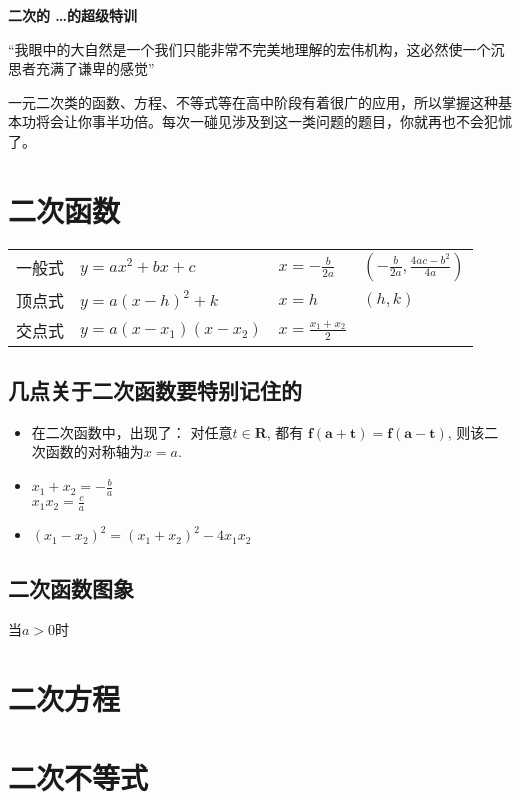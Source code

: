 \documentclass{article}
\newcommand*{\num}{10}
\begin{document}
\thispagestyle{plain}

\centerline{\Large \textbf{二次的 \dots 的超级特训}}
\vspace{30pt}

{\large“我眼中的大自然是一个我们只能非常不完美地理解的宏伟机构，这必然使一个沉思者充满了谦卑的感觉”}\\
\vspace{30pt}


一元二次类的函数、方程、不等式等在高中阶段有着很广的应用，所以掌握这种基本功将会让你事半功倍。每次一碰见涉及到这一类问题的题目，你就再也不会犯怵了。


\section{二次函数}

\begin{tabular}{c l l l}

  一般式 & $y=ax^2+bx+c$ & $x=-\frac{b}{2a}$ & $(-\frac{b}{2a},\frac{4ac-b^2}{4a})$ \\
  顶点式 & $y=a(x-h)^2+k$ & $x=h$ & $(h,k)$ \\
  交点式 & $y=a(x-x_1)(x-x_2)$ & $x=\frac{x_1+x_2}{2}$ &  \\

\end{tabular}
\vspace{20pt}

\subsection{几点关于二次函数要特别记住的}

\begin{itemize}
  \item 在二次函数中，出现了： 对任意$t\in \mathbf{R}$, 都有 $\mathbf{f(a+t)=f(a-t)}$, 则该二次函数的对称轴为$x=a$.
  \item $x_1+x_2=-\frac{b}{a}$\\$x_1x_2=\frac{c}{a}$
  \item $(x_1-x_2)^2=(x_1+x_2)^2-4x_1x_2$
\end{itemize}

\subsection{二次函数图象}
当$a>0$时


\section{二次方程}




\section{二次不等式}
\end{document}
